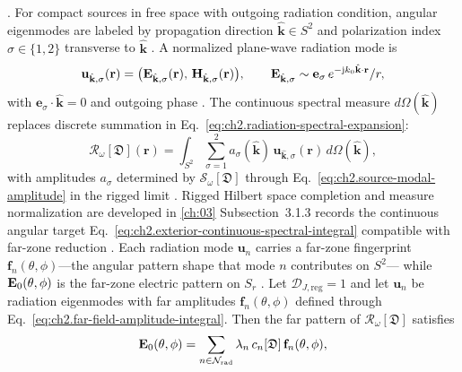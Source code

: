 \cite{hansen1988}. For compact sources in free space with outgoing radiation condition, angular eigenmodes are labeled by
propagation direction \(\hat{\mathbf{k}}\in S^{2}\) and polarization index \(\sigma\in\{1,2\}\)
transverse to \(\hat{\mathbf{k}}\) \cite{stratton1941}. A normalized plane-wave
radiation mode is
\begin{equation}
\label{eq:ch2.exterior-angular-eigenmode}
\mathbf{u}_{\hat{\mathbf{k}},\sigma}(\mathbf{r})
=
\big(\mathbf{E}_{\hat{\mathbf{k}},\sigma}(\mathbf{r}),\,\mathbf{H}_{\hat{\mathbf{k}},\sigma}(\mathbf{r})\big),
\qquad
\mathbf{E}_{\hat{\mathbf{k}},\sigma}\sim \mathbf{e}_\sigma\,e^{-\mathrm{j} k_0\hat{\mathbf{k}}\cdot\mathbf{r}}/r,
\end{equation}
with \(\mathbf{e}_\sigma\cdot\hat{\mathbf{k}}=0\) and outgoing phase
\cite{stratton1941}. The continuous spectral measure \(d\Omega(\hat{\mathbf{k}})\)
replaces discrete summation in Eq.~\eqref{eq:ch2.radiation-spectral-expansion}:
\label{eq:ch2.discrete-continuous-spectrum}
\begin{equation}
\label{eq:ch2.exterior-continuous-spectral-integral}
\mathcal{R}_\omega[\mathfrak{D}](\mathbf{r})
=
\int_{S^{2}}
\sum_{\sigma=1}^{2}
a_\sigma(\hat{\mathbf{k}})\,
\mathbf{u}_{\hat{\mathbf{k}},\sigma}(\mathbf{r})\,d\Omega(\hat{\mathbf{k}}),
\end{equation}
with amplitudes \(a_\sigma\) determined by \(\mathcal{S}_\omega[\mathfrak{D}]\) through
Eq.~\eqref{eq:ch2.source-modal-amplitude} in the rigged limit \cite{stratton1941}. Rigged
Hilbert space completion and measure normalization are developed in \ref{ch:03}
Subsection~3.1.3 records the continuous angular target
Eq.~\eqref{eq:ch2.exterior-continuous-spectral-integral} compatible with far-zone reduction
\cite{harrington2001}.
\label{prop:ch2.far-pattern-from-modes}
Each radiation mode $\mathbf{u}_n$ carries a far-zone fingerprint
$\mathbf{f}_n(\theta,\phi)$---the angular pattern shape that mode $n$ contributes on $S^2$---
while $\mathbf{E}_0(\theta,\phi)$ is the far-zone electric pattern on $S_r$
\cite{hansen1988,stratton1941}. Let \(\mathcal{D}_{J,\mathrm{reg}}=1\) and let \(\mathbf{u}_n\) be radiation eigenmodes with
far amplitudes \(\mathbf{f}_n(\theta,\phi)\) defined through
Eq.~\eqref{eq:ch2.far-field-amplitude-integral}. Then the far pattern of
\(\mathcal{R}_\omega[\mathfrak{D}]\) satisfies
\label{eq:ch2.far-pattern-modal}
\begin{equation}
\label{eq:ch2.spectral-far-pattern-expansion}
\mathbf{E}_0(\theta,\phi)
=
\sum_{n\in\mathcal{N}_{\mathrm{rad}}}
\lambda_n\,c_n[\mathfrak{D}]\,\mathbf{f}_n(\theta,\phi),
\end{equation}
